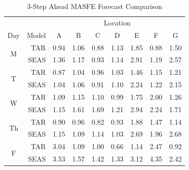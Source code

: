\begin{table}[htbp]
\scriptsize
\centering
\caption{3-Step Ahead MASFE Forecast Comparison}
\begin{tabular}{c|rccccccc}
  \hline
    & & \multicolumn{7}{c}{Location}\\
  \cline{5-7}
Day & Model & A & B & C & D & E & F & G \\ 
  \hline
  \multirow{2}{*}{M} & TAR & 0.94 & 1.06 & 0.88 & 1.13 & 1.85 & 0.88 & 1.50 \\ 
   & SEAS & 1.36 & 1.17 & 0.93 & 1.14 & 2.91 & 1.19 & 2.57 \\ 
   \hline
  \multirow{2}{*}{T} & TAR & 0.87 & 1.04 & 0.96 & 1.03 & 1.46 & 1.15 & 1.21 \\ 
   & SEAS & 1.04 & 1.06 & 0.91 & 1.10 & 2.24 & 1.22 & 2.15 \\ 
   \hline 
  \multirow{2}{*}{W} & TAR & 1.09 & 1.15 & 1.10 & 0.99 & 1.75 & 2.00 & 1.26 \\ 
   & SEAS & 1.15 & 1.61 & 1.69 & 1.21 & 2.94 & 2.24 & 1.71 \\ 
   \hline
 \multirow{2}{*}{Th}  & TAR & 0.90 & 0.96 & 0.82 & 0.93 & 1.88 & 1.47 & 1.14 \\ 
   & SEAS & 1.15 & 1.09 & 1.14 & 1.03 & 2.69 & 1.96 & 2.68 \\ 
  \hline
  \multirow{2}{*}{F} & TAR & 3.04 & 1.09 & 1.00 & 0.66 & 1.14 & 2.47 & 0.92 \\ 
   & SEAS & 3.53 & 1.57 & 1.42 & 1.33 & 3.12 & 4.35 & 2.42 \\ 
   \hline
\end{tabular}
\label{tab:trafficmase3}
\end{table}




